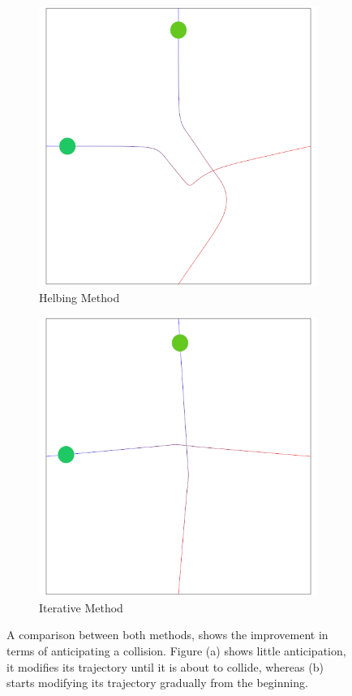 \begin{figure}[t]
 \centering
%
\begin{subfigure}[b]{0.33\linewidth}
 \centering
	\includegraphics[width=\linewidth]{images/res-helbing-crossing.png}
	\caption{Helbing Method}
 \end{subfigure}
%
\begin{subfigure}[b]{0.33\linewidth}
 \centering
	\includegraphics[width=\linewidth]{images/res-iter-crossing.png}
	\caption{Iterative Method}
 \end{subfigure}
% 
\caption{A comparison between both methods, shows the improvement in terms of anticipating a collision. Figure (a) shows little anticipation, it modifies its trajectory until it is about to collide, whereas (b) starts modifying its trajectory gradually from the beginning.}
\label{fig:res:helbing}
\end{figure}


